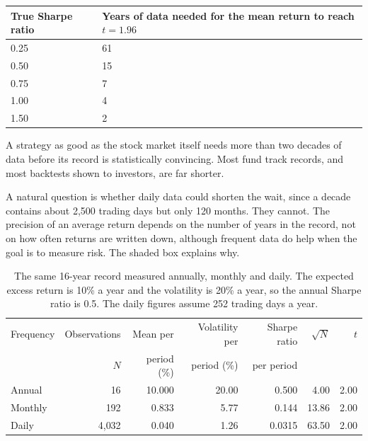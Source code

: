 \begin{center}
\small
\begin{tabular}{@{}ll@{}}
\toprule
True Sharpe ratio & Years of data needed for the mean return to reach $t = 1.96$ \\
\midrule
0.25 & 61 \\
0.50 & 15 \\
0.75 & 7 \\
1.00 & 4 \\
1.50 & 2 \\
\bottomrule
\end{tabular}
\end{center}

A strategy as good as the stock market itself needs more than two decades of data before its record is statistically convincing. Most fund track records, and most backtests shown to investors, are far shorter.

A natural question is whether daily data could shorten the wait, since a decade contains about 2,500 trading days but only 120 months. They cannot. The precision of an average return depends on the number of years in the record, not on how often returns are written down, although frequent data do help when the goal is to measure risk. The shaded box explains why.

\begin{table}[htbp]
\centering
\small
\caption{The same 16-year record measured annually, monthly and daily. The expected excess return is 10\% a year and the volatility is 20\% a year, so the annual Sharpe ratio is 0.5. The daily figures assume 252 trading days a year.}
\label{tab:01-frequency}
\begin{tabular}{@{}lrrrrrr@{}}
\toprule
Frequency & Observations & Mean per & Volatility per & Sharpe ratio & $\sqrt{N}$ & $t$ \\
 & $N$ & period (\%) & period (\%) & per period & & \\
\midrule
Annual  & 16    & 10.000 & 20.00 & 0.500  & 4.00  & 2.00 \\
Monthly & 192   & 0.833  & 5.77  & 0.144  & 13.86 & 2.00 \\
Daily   & 4{,}032 & 0.040 & 1.26  & 0.0315 & 63.50 & 2.00 \\
\bottomrule
\end{tabular}
\end{table}

